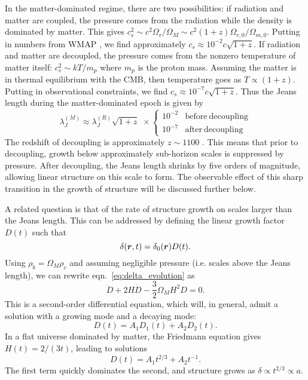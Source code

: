 In the matter-dominated regime, there are two possibilities: if radiation and
matter are coupled, the pressure comes from the radiation
while the density is dominated by matter.  This gives
$c_s^2 \sim c^2 \Omega_r / \Omega_M \sim c^2 (1 + z)
\Omega_{r,0}/\Omega_{m, 0}$.
Putting in numbers from WMAP \citep{WMAP7}, we find approximately
$c_s \approx 10^{-2} c \sqrt{1 + z}$.
If radiation and matter are decoupled, the pressure comes from the nonzero
temperature of matter itself:
$c_s^2 \sim kT/m_p$ where $m_p$ is the proton mass.  Assuming the matter
is in thermal equilibrium with the CMB, then temperature goes as
$T \propto (1 + z)$.  Putting in observational constraints, we find
$c_s \approx 10^{-7} c \sqrt{1 + z}$.  Thus the Jeans length during the
matter-dominated epoch is given by
\begin{equation}
  \label{eq:jeans_matter}
  \lambda_J^{(M)} \approx \lambda_J^{(R)}\sqrt{1 + z}\,\, \times \left\{
  \begin{array}{ll}
    10^{-2} & \mathrm{before\ decoupling}\\
    10^{-7} & \mathrm{after\ decoupling}
  \end{array}
  \right.
\end{equation}
The redshift of decoupling is approximately $z \sim 1100$ \citep[for a physical
argument for this, see][]{ryden2003cosmology}.  This means that prior to
decoupling, growth below approximately sub-horizon scales is suppressed by
pressure.  After decoupling, the Jeans length shrinks by five orders of
magnitude, allowing linear structure on this scale to form.  The observable
effect of this sharp transition in the growth of structure will be discussed
further below.

A related question is that of the rate of structure growth
on scales larger than the Jeans length. 
This can be addressed by defining the linear growth
factor $D(t)$ such that
\begin{equation}
  \label{eq:linear_growth_def}
  \delta(\boldsymbol{r}, t) = \delta_0(\boldsymbol{r})D(t).
\end{equation}
Using $\rho_b = \Omega_M\rho_c$ and assuming negligible pressure (i.e. scales
above the Jeans length), we can rewrite
eqn.~\ref{eq:delta_evolution} as
\begin{equation}
  \label{eq:linear_growth_eqn}
  \ddot{D} + 2H\dot{D} - \frac{3}{2}\Omega_M H^2D = 0.
\end{equation}
This is a second-order differential equation, which will, in general,
admit a solution with a growing mode and a decaying mode:
\begin{equation}
  D(t) = A_1 D_1(t) + A_2 D_2(t).
\end{equation}
In a flat universe dominated by matter, the
Friedmann equation gives $H(t) = 2 / (3t)$, leading to solutions
\begin{equation}
  D(t) = A_1 t^{2/3} + A_2 t^{-1}.
\end{equation}
The first term quickly dominates the second, and structure grows as
$\delta \propto t^{2/3} \propto a$.

